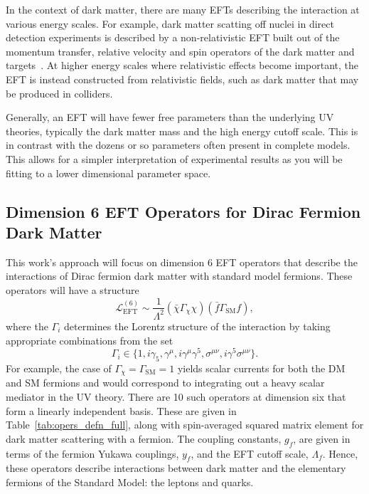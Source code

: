 In the context of dark matter, there are many EFTs describing the interaction at various energy scales. For example, dark matter scatting off nuclei in direct detection experiments is described by a non-relativistic EFT built out of the momentum transfer, relative velocity and spin operators of the dark matter and targets~\cite{Cirelli:2013ufw_oct_Toolsmodelindependentbounds, Fitzpatrick:2012ix_EffectiveFieldTheory}. At higher energy scales where relativistic effects become important, the EFT is instead constructed from relativistic fields, such as dark matter that may be produced in colliders.

Generally, an EFT will have fewer free parameters than the underlying UV theories, typically the dark matter mass and the high energy cutoff scale. This is in contrast with the dozens or so parameters often present in complete models. This allows for a simpler interpretation of experimental results as you will be fitting to a lower dimensional parameter space. 

\subsection{Dimension 6 EFT Operators for Dirac Fermion Dark Matter}
This work's approach will focus on dimension 6 EFT operators that describe the interactions of Dirac fermion dark matter with standard model fermions. These operators will have a structure 
\begin{equation}
    \mathcal{L}_\mathrm{EFT}^{(6)} \sim \frac{1}{\Lambda^2}(\bar{\chi}\Gamma_\chi \chi)(\bar{f}\Gamma_{\mathrm{SM}}f),
\end{equation}
where the $\Gamma_i$ determines the Lorentz structure of the interaction by taking appropriate combinations from the set
\begin{equation}
    \Gamma_i\in \{1, i\gamma_5, \gamma^\mu, i\gamma^\mu \gamma^5, \sigma^{\mu\nu}, i\gamma^5 \sigma^{\mu\nu}\}.
\end{equation}
For example, the case of $\Gamma_\chi = \Gamma_\mathrm{SM} = 1$ yields scalar currents for both the DM and SM fermions and would correspond to integrating out a heavy scalar mediator in the UV theory. There are 10 such operators at dimension six that form a linearly independent basis. These are given in Table~\ref{tab:opers_defn_full}, along with spin-averaged squared matrix element for dark matter scattering with a fermion. The coupling constants, $g_f$, are given in terms of the fermion Yukawa couplings, $y_f$, and the EFT cutoff scale, $\Lambda_f$. Hence, these operators describe interactions between dark matter and the elementary fermions of the Standard Model: the leptons and quarks. 




